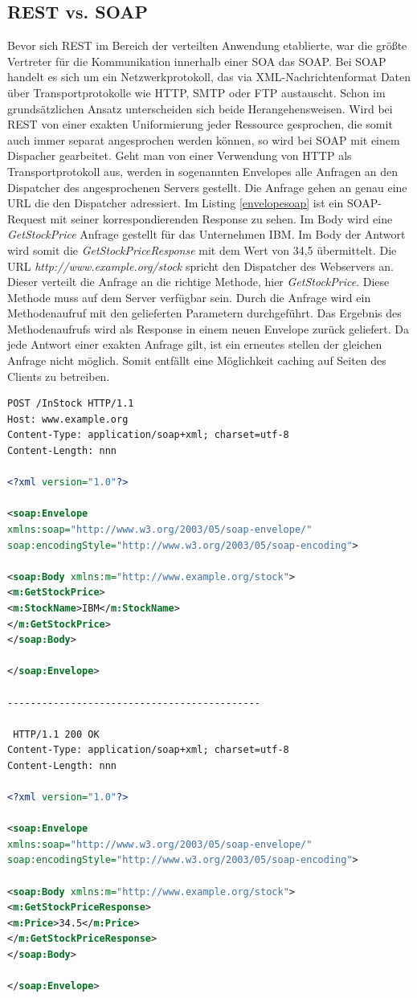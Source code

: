 \documentclass[fleqn,10.5pt,ngerman]{SelfArx}
\begin{document}
\subsection{REST vs. SOAP}
Bevor sich REST im Bereich der verteilten Anwendung etablierte, war die größte Vertreter für die Kommunikation innerhalb einer SOA das SOAP. Bei SOAP handelt es sich um ein Netzwerkprotokoll, das via XML-Nachrichtenformat Daten über Transportprotokolle wie HTTP, SMTP oder FTP austauscht. Schon im grundsätzlichen Ansatz unterscheiden sich beide Herangehensweisen. Wird bei REST von einer exakten Uniformierung jeder Ressource gesprochen, die somit auch immer separat angesprochen werden können, so wird bei SOAP mit einem Dispacher gearbeitet. Geht man von einer Verwendung von HTTP als Transportprotokoll aus, werden in sogenannten Envelopes alle Anfragen an den Dispatcher des angesprochenen Servers gestellt. Die Anfrage gehen an genau eine URL die den Dispatcher adressiert. Im Listing \ref{envelopesoap} ist ein SOAP-Request mit seiner korrespondierenden Response zu sehen. Im Body wird eine \textit{GetStockPrice} Anfrage gestellt für das Unternehmen IBM. Im Body der Antwort wird somit die \textit{GetStockPriceResponse} mit dem Wert von 34,5 übermittelt. Die URL \textit{http://www.example.org/stock} spricht den Dispatcher des Webservers an. Dieser verteilt die Anfrage an die richtige Methode, hier \textit{GetStockPrice}. Diese Methode muss auf dem Server verfügbar sein. Durch die Anfrage wird ein Methodenaufruf mit den gelieferten Parametern durchgeführt. Das Ergebnis des Methodenaufrufs wird als Response in einem neuen Envelope zurück geliefert. Da jede Antwort einer exakten Anfrage gilt, ist ein erneutes stellen der gleichen Anfrage nicht möglich. Somit entfällt eine Möglichkeit caching auf Seiten des Clients zu betreiben.
\vspace{4em}
\begin{lstlisting}[caption=Beispiel: SOAP-Request und SOAP-Response als Envelope, label=envelopesoap, language=xml]
 POST /InStock HTTP/1.1
Host: www.example.org
Content-Type: application/soap+xml; charset=utf-8
Content-Length: nnn

<?xml version="1.0"?>

<soap:Envelope
xmlns:soap="http://www.w3.org/2003/05/soap-envelope/"
soap:encodingStyle="http://www.w3.org/2003/05/soap-encoding">

<soap:Body xmlns:m="http://www.example.org/stock">
<m:GetStockPrice>
<m:StockName>IBM</m:StockName>
</m:GetStockPrice>
</soap:Body>

</soap:Envelope>

--------------------------------------------

 HTTP/1.1 200 OK
Content-Type: application/soap+xml; charset=utf-8
Content-Length: nnn

<?xml version="1.0"?>

<soap:Envelope
xmlns:soap="http://www.w3.org/2003/05/soap-envelope/"
soap:encodingStyle="http://www.w3.org/2003/05/soap-encoding">

<soap:Body xmlns:m="http://www.example.org/stock">
<m:GetStockPriceResponse>
<m:Price>34.5</m:Price>
</m:GetStockPriceResponse>
</soap:Body>

</soap:Envelope>
\end{lstlisting}
\end{document}
